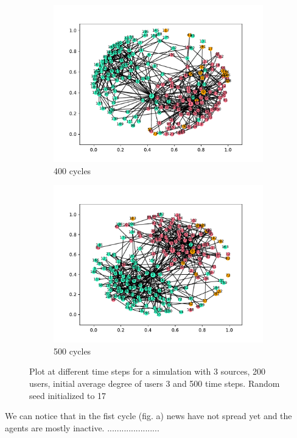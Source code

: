 \begin{figure}
  \begin{subfigure}[t]{.45\textwidth}
    \centering
    \includegraphics[trim={1cm .5cm 1cm 1cm}, clip, width=\linewidth]{img/pdf/plot-0400.pdf} 
    \caption{400 cycles} \label{fig:300}
  \end{subfigure}
  \begin{subfigure}[t]{.45\textwidth}
    \centering
    \includegraphics[trim={1cm .5cm 1cm 1cm}, clip, width=\linewidth]{img/pdf/plot-0500.pdf} 
    \caption{500 cycles} \label{fig:400}
  \end{subfigure}
 
  \caption{Plot at different time steps for a simulation with 3 sources, 200 users, initial average degree of users 3 and 500 time steps. Random seed initialized to 17}
\end{figure}


We can notice that in the fist cycle (fig. a) news have not spread yet and the agents are mostly inactive. ......................

